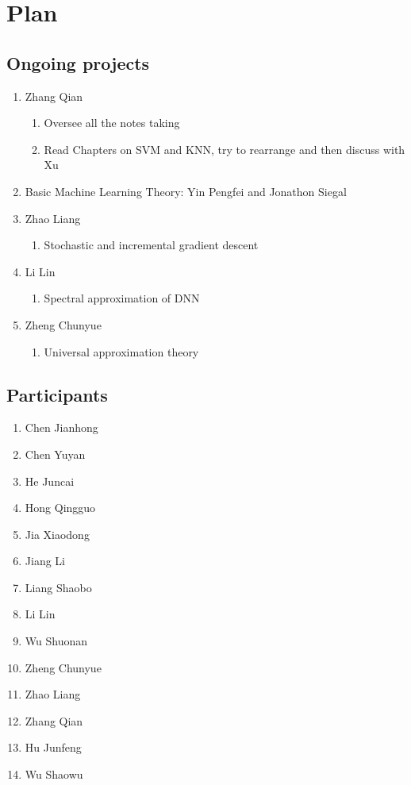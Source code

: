 \setcounter{chapter}{-1}
\chapter{Plan }

\section{Ongoing projects}
\begin{enumerate}
\item Zhang Qian
  \begin{enumerate}
\item Oversee all the notes taking
  \item Read Chapters on SVM and KNN, try to rearrange and then
    discuss with Xu
  \end{enumerate}
\item Basic Machine Learning Theory:  Yin Pengfei and Jonathon Siegal
\item Zhao Liang
  \begin{enumerate}
  \item Stochastic and incremental gradient descent
  \end{enumerate}
\item Li Lin
  \begin{enumerate}
  \item Spectral approximation of DNN
  \end{enumerate}
\item Zheng Chunyue
  \begin{enumerate}
  \item Universal approximation theory
  \end{enumerate}
\end{enumerate}


\section{Participants}
\begin{enumerate}
\item Chen Jianhong
\item Chen Yuyan 
\item He Juncai 
\item Hong Qingguo
\item Jia Xiaodong
\item Jiang Li
\item Liang Shaobo
\item Li Lin
\item Wu Shuonan
\item Zheng Chunyue
\item Zhao Liang
\item Zhang Qian
\item Hu Junfeng
\item Wu Shaowu
\end{enumerate}

